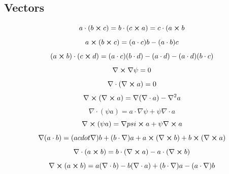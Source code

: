 \documentclass[12pt]{article}
\begin{document}
\subsection{Vectors} \label{subsection1-1}
    \begin{equation} \label{eq:1-1-1}
        a \cdot (b \cross c) = b \cdot (c \cross a) = c \cdot (a \cross b   
    \end{equation}
    \begin{equation} \label{eq:1-1-2}
        a \cross (b \cross c) = (a \cdot c) b - (a \cdot b) c
    \end{equation}
    \begin{equation} \label{eq:1-1-3}
        (a \cross b) \cdot (c \cross d) = (a \cdot c) (b \cdot d) - (a \cdot d) - (a \cdot d) (b \cdot c)
    \end{equation}
    \begin{equation} \label{eq:1-1-4}
        \nabla \cross \nabla \psi = 0
    \end{equation}
    \begin{equation} \label{eq:1-1-5}
        \nabla \cdot (\nabla \cross a) = 0
    \end{equation}
    \begin{equation} \label{eq:1-1-6}
        \nabla \cross (\nabla \cross a) = \nabla (\nabla \cdot a) - \nabla^2 a 
    \end{equation}
    \begin{equation} \label{eq:1-1-7}
        \nabla \cdot (\psi a) = a \cdot \nabla \psi + \psi \nabla \cdot a
    \end{equation}
    \begin{equation} \label{eq:1-1-8}
        \nabla \cross (\psi a) = \nabla psi \cross a + \psi \nabla \cross a 
    \end{equation}
    \begin{equation} \label{eq:1-1-9}
        \nabla (a \cdot b) = (a cdot \nabla) b + (b \cdot \nabla) a + a \cross (\nabla \cross b) + b \cross (\nabla \cross a)
    \end{equation}
    \begin{equation} \label{eq:1-1-10}
        \nabla \cdot (a \cross b) = b \cdot (\nabla \cross a) - a \cdot (\nabla \cross b)
    \end{equation}
    \begin{equation} \label{eq:1-1-11}
        \nabla \cross (a \cross b) = a (\nabla \cdot b) - b (\nabla \cdot a) + (b \cdot \nabla) a - (a \cdot \nabla) b
    \end{equation}
\end{document}
